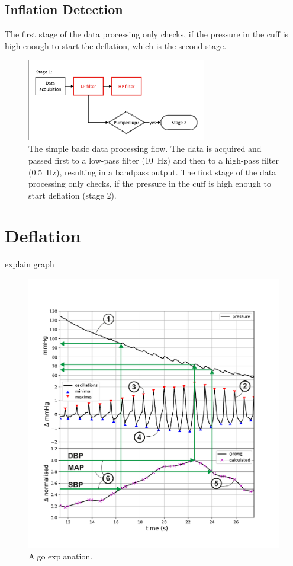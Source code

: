 

\subsection{Inflation Detection}
The first stage of the data processing only checks, if the pressure in the cuff is high enough to start the deflation, which is the second stage.

\begin{figure}[ht]
\centering
\includegraphics[width=0.7\textwidth]{figures/stage1.pdf}
\caption{The simple basic data processing flow. The data is acquired and passed first to a low-pass filter (\SI{10}{\Hz}) and then to a high-pass filter (\SI{0.5}{\Hz}), resulting in a bandpass output. The first stage of the data processing only checks, if the pressure in the cuff is high enough to start deflation (stage 2).}
\label{fig:stage1}
\end{figure}

\section{Deflation}
explain graph

\begin{figure}[ht]
\centering
\includegraphics[width=\textwidth]{figures/algorithm_example_annotated.pdf}
\caption{Algo explanation.}
\label{fig:algoExplain}
\end{figure}



